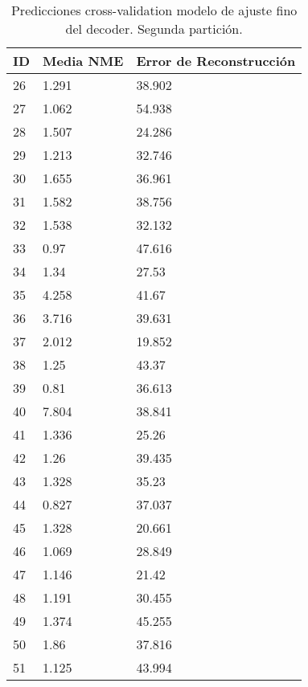 \begin{table}[!ht]
    \centering
    \caption{Predicciones cross-validation modelo de ajuste fino del  decoder. Segunda partición.}
    \begin{tabular}{|l|l|l|}
    \hline
    \cellcolor{gray!25}\textbf{ID} & \cellcolor{gray!25}\textbf{Media NME} & \cellcolor{gray!25}\textbf{Error de Reconstrucción}\\ \hline
        26 & 1.291 & 38.902 \\ \hline
        27 & 1.062 & 54.938 \\ \hline
        28 & 1.507 & 24.286 \\ \hline
        29 & 1.213 & 32.746 \\ \hline
        30 & 1.655 & 36.961 \\ \hline
        31 & 1.582 & 38.756 \\ \hline
        32 & 1.538 & 32.132 \\ \hline
        33 & 0.97 & 47.616 \\ \hline
        34 & 1.34 & 27.53 \\ \hline
        35 & 4.258 & 41.67 \\ \hline
        36 & 3.716 & 39.631 \\ \hline
        37 & 2.012 & 19.852 \\ \hline
        38 & 1.25 & 43.37 \\ \hline
        39 & 0.81 & 36.613 \\ \hline
        40 & 7.804 & 38.841 \\ \hline
        41 & 1.336 & 25.26 \\ \hline
        42 & 1.26 & 39.435 \\ \hline
        43 & 1.328 & 35.23 \\ \hline
        44 & 0.827 & 37.037 \\ \hline
        45 & 1.328 & 20.661 \\ \hline
        46 & 1.069 & 28.849 \\ \hline
        47 & 1.146 & 21.42 \\ \hline
        48 & 1.191 & 30.455 \\ \hline
        49 & 1.374 & 45.255 \\ \hline
        50 & 1.86 & 37.816 \\ \hline
        51 & 1.125 & 43.994 \\ \hline
    \end{tabular}
    \label{table:Daugmentation_images_2}
\end{table}

